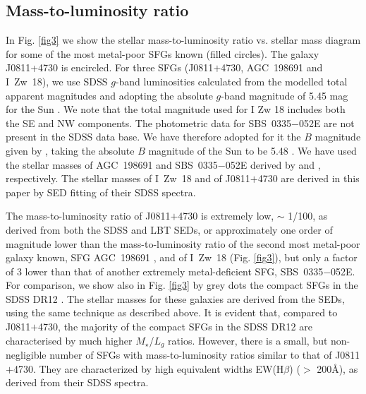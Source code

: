 \documentclass[useAMS,usenatbib]{mn2e}
\begin{document}
\subsection{Mass-to-luminosity ratio}

In Fig. \ref{fig3} we show the stellar mass-to-luminosity 
ratio vs. stellar mass diagram for some of the most metal-poor SFGs known (filled circles). The galaxy
J0811+4730 is encircled. For three SFGs (J0811$+$4730, AGC~198691 and I~Zw~18),
we use SDSS $g$-band luminosities
calculated from the modelled total apparent magnitudes and adopting the 
absolute $g$-band magnitude of 5.45 mag for the Sun \citep{B03}.  
We note that the total magnitude used for I Zw 18 includes both the SE 
and NW components. The photometric
data for SBS~0335$-$052E are not present in the SDSS data base.
We have therefore adopted for it the $B$ magnitude given by \citet*{P04}, taking the absolute
$B$ magnitude of the Sun to be 5.48 \citep{BM98}. 
We have used the stellar masses of AGC~198691 and SBS~0335$-$052E derived by
\citet{H16} and \citet{I14}, respectively. The stellar masses of I~Zw~18 
and of J0811$+$4730 are derived in this paper by SED fitting
of their SDSS spectra. 

The mass-to-luminosity ratio of J0811$+$4730 is extremely
low, $\sim$ 1/100, as derived from both the SDSS and LBT SEDs,
or approximately one order of magnitude lower than the 
mass-to-luminosity 
ratio of the second most metal-poor galaxy known, SFG AGC~198691 \citep{H16}, 
and of I~Zw~18 (Fig. \ref{fig3}), but only a factor of 3 lower than that of 
another extremely metal-deficient SFG, SBS~0335$-$052E. 
For comparison, we show also in Fig. \ref{fig3} by grey dots the compact SFGs in
the SDSS DR12 \citep{I16c}. The stellar masses for these galaxies are derived 
from the SEDs, using the same technique as described above. It is evident that, 
compared to  J0811$+$4730, the majority of the compact SFGs in  
the SDSS DR12 are characterised by much higher
$M_\star$/$L_g$ ratios. However, there is a 
small, but non-negligible number of SFGs with mass-to-luminosity 
ratios similar to that of J0811$+$4730. They are characterized by high 
equivalent widths EW(H$\beta$) ($>$ 200\AA),  as derived from their SDSS 
spectra.
\end{document}

